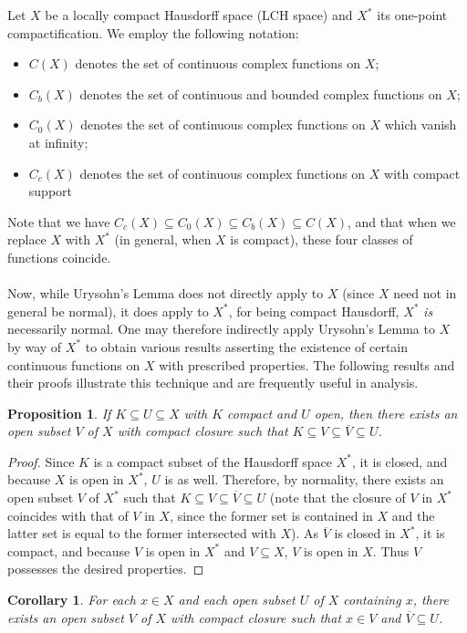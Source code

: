 \documentclass[12pt]{article}
\theoremstyle{plain}
\newtheorem{cor}{Corollary}
\newtheorem{prop}{Proposition}
\begin{document}
Let $X$ be a locally compact Hausdorff space (LCH space) and $X^*$ its one-point compactification. We employ the following notation:
\begin{itemize}
\item $C(X)$ denotes the set of continuous complex functions on $X$;
\item $C_b(X)$ denotes the set of continuous and bounded complex functions on $X$;
\item $C_0(X)$ denotes the set of continuous complex functions on $X$ which vanish at infinity;
\item $C_c(X)$ denotes the set of continuous complex functions on $X$ with compact support
\end{itemize}
Note that we have $C_c(X)\subseteq C_0(X)\subseteq C_b(X)\subseteq C(X)$, and that when we replace $X$ with $X^*$ (in general, when $X$ is compact), these four classes of functions coincide.\\\\
Now, while Urysohn's Lemma does not directly apply to $X$ (since $X$ need not in general be normal), it does apply to $X^*$, for being compact Hausdorff, $X^*$ \emph{is} necessarily normal. One may therefore indirectly apply Urysohn's Lemma to $X$ by way of $X^*$ to obtain various results asserting the existence of certain continuous functions on $X$ with prescribed properties. The following results and their proofs illustrate this technique and are frequently useful in analysis. 
\begin{prop}
If $K\subseteq U\subseteq X$ with $K$ compact and $U$ open, then there exists an open subset $V$ of $X$ with compact closure such that $K\subseteq V\subseteq\overline{V}\subseteq U$.
\end{prop}
\begin{proof}
Since $K$ is a compact subset of the Hausdorff space $X^*$, it is closed, and because $X$ is open in $X^*$, $U$ is as well. Therefore, by normality, there exists an open subset $V$ of $X^*$ such that $K\subseteq V\subseteq\overline{V}\subseteq U$ (note that the closure of $V$ in $X^*$ coincides with that of $V$ in $X$, since the former set is contained in $X$ and the latter set is equal to the former intersected with $X$). As $\overline{V}$ is closed in $X^*$, it is compact, and because $V$ is open in $X^*$ and $V\subseteq X$, $V$ is open in $X$. Thus $V$ possesses the desired properties.
\end{proof}
\begin{cor}
For each $x\in X$ and each open subset $U$ of $X$ containing $x$, there exists an open subset $V$ of $X$ with compact closure such that $x\in V$ and $\overline{V}\subseteq U$.
\end{cor}
\end{document}
